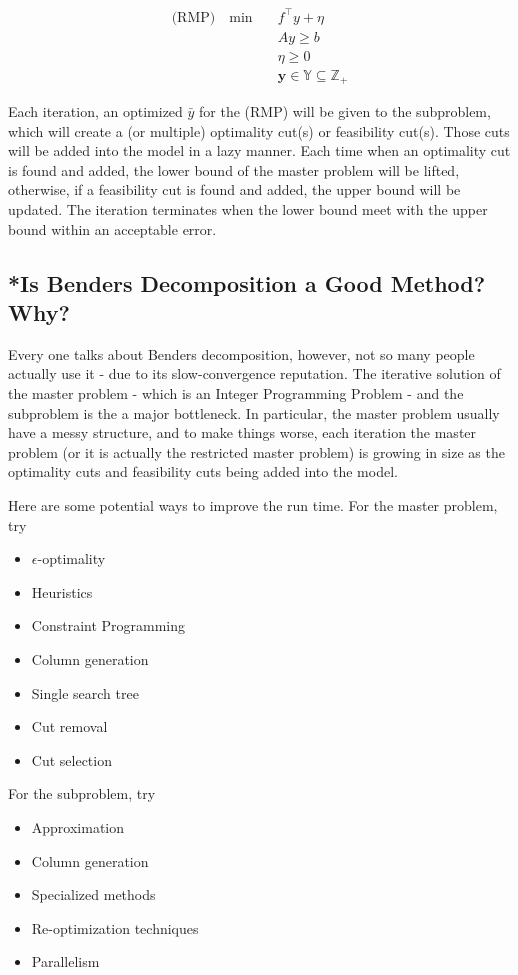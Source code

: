             \begin{align*}
                \text{(RMP)} \quad \min \quad &f^\top y + \eta\\
                & Ay \ge b \\
                & \eta \ge 0 \\
                & \mathbf{y} \in \mathbb{Y} \subseteq \mathbb{Z}_+
            \end{align*}

            Each iteration, an optimized $\bar{y}$ for the (RMP) will be given to the subproblem, which will create a (or multiple) optimality cut(s) or feasibility cut(s). Those cuts will be added into the model in a lazy manner. Each time when an optimality cut is found and added, the lower bound of the master problem will be lifted, otherwise, if a feasibility cut is found and added, the upper bound will be updated. The iteration terminates when the lower bound meet with the upper bound within an acceptable error.

        \subsection{*Is Benders Decomposition a Good Method? Why?}
            Every one talks about Benders decomposition, however, not so many people actually use it - due to its slow-convergence reputation. The iterative solution of the master problem - which is an Integer Programming Problem - and the subproblem is the a major bottleneck. In particular, the master problem usually have a messy structure, and to make things worse, each iteration the master problem (or it is actually the restricted master problem) is growing in size as the optimality cuts and feasibility cuts being added into the model.

            Here are some potential ways to improve the run time. For the master problem, try
            \begin{itemize}
                \item $\epsilon$-optimality
                \item Heuristics
                \item Constraint Programming
                \item Column generation
                \item Single search tree
                \item Cut removal
                \item Cut selection
            \end{itemize}

            For the subproblem, try
            \begin{itemize}
                \item Approximation
                \item Column generation
                \item Specialized methods
                \item Re-optimization techniques
                \item Parallelism
            \end{itemize}


